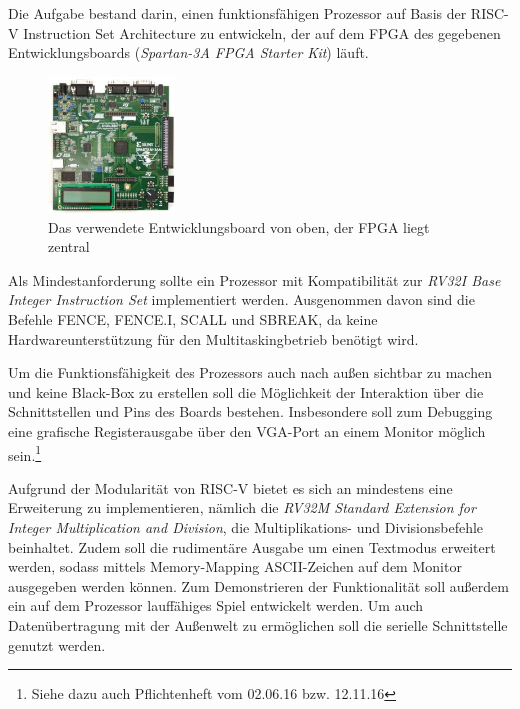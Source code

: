 

Die Aufgabe bestand darin, einen funktionsf\"ahigen Prozessor auf Basis der RISC-V Instruction Set Architecture zu entwickeln, der auf dem FPGA des gegebenen Entwicklungsboards (\textit{Spartan-3A FPGA Starter Kit}) l\"auft.
\begin{figure}[H]
	\centering
		\includegraphics[width=0.3\textwidth]{Board.png}
	\caption{Das verwendete Entwicklungsboard von oben, der FPGA liegt zentral}
	\label{fig:board}
\end{figure}


Als Mindestanforderung sollte ein Prozessor mit Kompatibilit\"at zur \textit{RV32I Base Integer Instruction Set} implementiert werden. Ausgenommen davon sind die Befehle FENCE, FENCE.I, SCALL und SBREAK, da keine Hardwareunterst\"utzung f\"ur den Multitaskingbetrieb ben\"otigt wird.

Um die Funktionsf\"ahigkeit des Prozessors auch nach au{\ss}en sichtbar zu machen und keine Black-Box zu erstellen soll die M\"oglichkeit der Interaktion \"uber die Schnittstellen und Pins des Boards bestehen. Insbesondere soll zum Debugging eine grafische Registerausgabe \"uber den VGA-Port an einem Monitor m\"oglich sein.\footnote{Siehe dazu auch Pflichtenheft vom 02.06.16 bzw. 12.11.16}


Aufgrund der Modularit\"at von RISC-V bietet es sich an mindestens eine Erweiterung zu implementieren, n\"amlich die \textit{RV32M Standard Extension for Integer Multiplication and Division}, die Multiplikations- und Divisionsbefehle beinhaltet. Zudem soll die rudiment\"are Ausgabe um einen Textmodus erweitert werden, sodass mittels Memory-Mapping ASCII-Zeichen auf dem Monitor ausgegeben werden k\"onnen. Zum Demonstrieren der Funktionalit\"at soll au{\ss}erdem ein auf dem Prozessor lauff\"ahiges Spiel entwickelt werden. Um auch Daten\"ubertragung mit der Au{\ss}enwelt zu erm\"oglichen soll die serielle Schnittstelle genutzt werden.

